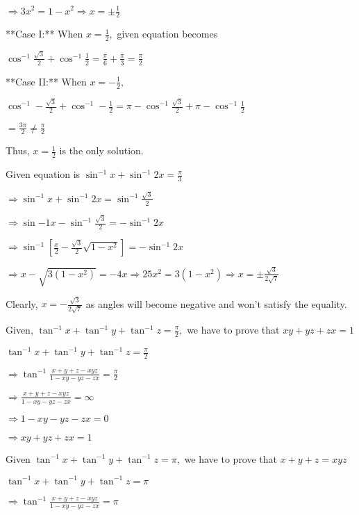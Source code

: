   $\Rightarrow 3x^2 = 1 - x^2 \Rightarrow x = \pm\frac{1}{2}$

  **Case I:** When $x = \frac{1}{2},$ given equation becomes

  $\cos^{-1}\frac{\sqrt{3}}{2} + \cos^{-1}\frac{1}{2} = \frac{\pi}{6} + \frac{\pi}{3} = \frac{\pi}{2}$

  **Case II:** When $x = -\frac{1}{2},$

  $\cos^{-1}-\frac{\sqrt{3}}{2} + \cos^{-1}-\frac{1}{2} = \pi - \cos^{-1}\frac{\sqrt{3}}{2} + \pi - \cos^{-1}\frac{1}{2}$

  $= \frac{3\pi}{2}\neq \frac{\pi}{2}$

  Thus, $x = \frac{1}{2}$ is the only solution.

\item Given equation is $\sin^{-1}x + \sin^{-1}2x = \frac{\pi}{3}$

  $\Rightarrow \sin^{-1}x + \sin^{-1}2x = \sin^{-1}\frac{\sqrt{3}}{2}$

  $\Rightarrow \sin{-1}x - \sin^{-1}\frac{\sqrt{3}}{2} = -\sin^{-1}2x$

  $\Rightarrow \sin^{-1}\left[\frac{x}{2} - \frac{\sqrt{3}}{2}\sqrt{1 - x^2}\right] = -\sin^{-1}2x$

  $\Rightarrow x - \sqrt{3(1 - x^2)} = -4x \Rightarrow 25x^2 = 3(1 - x^2) \Rightarrow x = \pm\frac{\sqrt{3}}{2\sqrt{7}}$

  Clearly, $x = -\frac{\sqrt{3}}{2\sqrt{7}}$ as angles will become negative and won't satisfy the equality.

\item Given, $\tan^{-1}x + \tan^{-1}y + \tan^{-1}z= \frac{\pi}{2},$ we have to prove that $xy + yz + zx = 1$

  $\tan^{-1}x + \tan^{-1}y + \tan^{-1}z= \frac{\pi}{2}$

  $\Rightarrow \tan^{-1}\frac{x + y + z - xyz}{1 - xy - yz - zx} = \frac{\pi}{2}$

  $\Rightarrow \frac{x + y + z - xyz}{1 - xy - yz - zx} = \infty$

  $\Rightarrow 1 - xy - yz - zx = 0$

  $\Rightarrow x y + yz + zx = 1$

\item Given $\tan^{-1}x + \tan^{-1}y + \tan^{-1}z= \pi,$ we have to prove that $x + y + z = xyz$

  $\tan^{-1}x + \tan^{-1}y + \tan^{-1}z= \pi$

  $\Rightarrow \tan^{-1}\frac{x + y + z - xyz}{1 - xy - yz - zx} = \pi$


